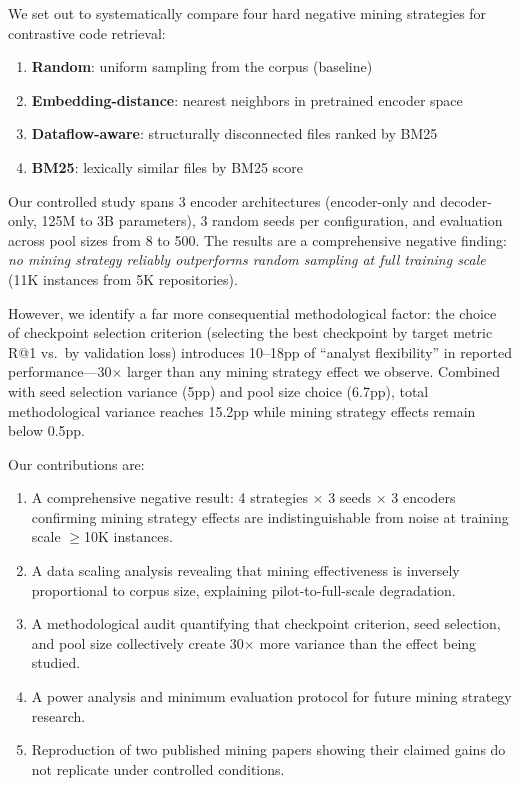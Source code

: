 \documentclass[11pt,a4paper]{article}
\begin{document}
We set out to systematically compare four hard negative mining strategies for contrastive code retrieval:
\begin{enumerate}
    \item \textbf{Random}: uniform sampling from the corpus (baseline)
    \item \textbf{Embedding-distance}: nearest neighbors in pretrained encoder space
    \item \textbf{Dataflow-aware}: structurally disconnected files ranked by BM25
    \item \textbf{BM25}: lexically similar files by BM25 score
\end{enumerate}

Our controlled study spans 3 encoder architectures (encoder-only and decoder-only, 125M to 3B parameters), 3 random seeds per configuration, and evaluation across pool sizes from 8 to 500.
The results are a comprehensive negative finding: \textit{no mining strategy reliably outperforms random sampling at full training scale} (11K instances from 5K repositories).

However, we identify a far more consequential methodological factor: the choice of checkpoint selection criterion (selecting the best checkpoint by target metric R@1 vs.\ by validation loss) introduces 10--18pp of ``analyst flexibility'' in reported performance---30$\times$ larger than any mining strategy effect we observe.
Combined with seed selection variance (5pp) and pool size choice (6.7pp), total methodological variance reaches 15.2pp while mining strategy effects remain below 0.5pp.

Our contributions are:
\begin{enumerate}
    \item A comprehensive negative result: 4 strategies $\times$ 3 seeds $\times$ 3 encoders confirming mining strategy effects are indistinguishable from noise at training scale $\geq$10K instances.
    \item A data scaling analysis revealing that mining effectiveness is inversely proportional to corpus size, explaining pilot-to-full-scale degradation.
    \item A methodological audit quantifying that checkpoint criterion, seed selection, and pool size collectively create 30$\times$ more variance than the effect being studied.
    \item A power analysis and minimum evaluation protocol for future mining strategy research.
    \item Reproduction of two published mining papers showing their claimed gains do not replicate under controlled conditions.
\end{enumerate}
\end{document}
